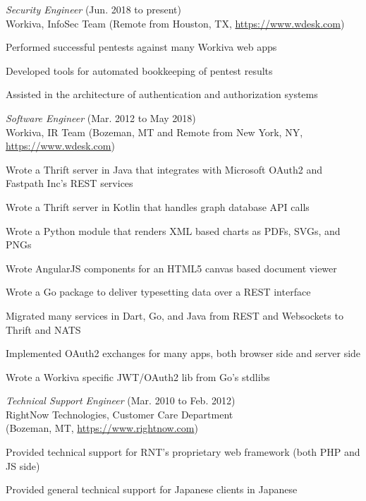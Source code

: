 \documentclass[10pt, a4paper]{article}
\begin{document}
\begin{itemize*}
  \item \emph{Security Engineer} (Jun. 2018 to present)\\
    Workiva, InfoSec Team (Remote from Houston, TX, \url{https://www.wdesk.com})
    \begin{itemize*}
    \item Performed successful pentests against many Workiva web apps
    \item Developed tools for automated bookkeeping of pentest results
    \item Assisted in the architecture of authentication and authorization systems
    \end{itemize*}
  \item \emph{Software Engineer} (Mar. 2012 to May 2018)\\
    Workiva, IR Team (Bozeman, MT and Remote from New York, NY, \url{https://www.wdesk.com})
    \begin{itemize*}
    \item Wrote a Thrift server in Java that integrates with Microsoft OAuth2 and Fastpath Inc's REST services
    \item Wrote a Thrift server in Kotlin that handles graph database API calls
    \item Wrote a Python module that renders XML based charts as PDFs, SVGs, and PNGs
    \item Wrote AngularJS components for an HTML5 canvas based document viewer
    \item Wrote a Go package to deliver typesetting data over a REST interface
    \item Migrated many services in Dart, Go, and Java from REST and Websockets to Thrift and NATS
    \item Implemented OAuth2 exchanges for many apps, both browser side and server side
    \item Wrote a Workiva specific JWT/OAuth2 lib from Go's stdlibs
    \end{itemize*}
  \item \emph{Technical Support Engineer} (Mar. 2010 to Feb. 2012)\\
    RightNow Technologies, Customer Care Department\\
    (Bozeman, MT, \url{https://www.rightnow.com})
    \begin{itemize*}
      \item Provided technical support for RNT's proprietary web framework (both PHP and JS side)
      \item Provided general technical support for Japanese clients in Japanese

\end{itemize*}
\end{itemize*}
\end{document}
